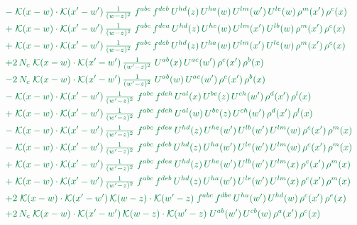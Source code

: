 \documentclass[10pt]{article}
\numberwithin{equation}{section}
\begin{document}
\begin{align}
&\quad{\color{JIM}-\;\mathcal{K}(x-w)\cdot\mathcal{K}(x'-w')\,\tfrac{1}{(w-z)^{2}}\;f^{abc}\,f^{deb}\,U^{hd}(z)\,U^{ha}(w)\,U^{lm}(w')\,U^{le}(w)\,\rho^{m}(x')\,\rho^{c}(x)}\notag\\
&\quad{\color{JIM}+\;\mathcal{K}(x-w)\cdot\mathcal{K}(x'-w')\,\tfrac{1}{(w-z)^{2}}\;f^{abc}\,f^{dea}\,U^{hd}(z)\,U^{he}(w)\,U^{lm}(x')\,U^{lb}(w)\,\rho^{m}(x')\,\rho^{c}(x)}\notag\\
&\quad{\color{JIM}+\;\mathcal{K}(x-w)\cdot\mathcal{K}(x'-w')\,\tfrac{1}{(w-z)^{2}}\;f^{abc}\,f^{deb}\,U^{hd}(z)\,U^{ha}(w)\,U^{lm}(x')\,U^{le}(w)\,\rho^{m}(x')\,\rho^{c}(x)}\notag\\
&\quad{\color{JIM}+2\,N_c\;\mathcal{K}(x-w)\cdot\mathcal{K}(x'-w')\,\tfrac{1}{(w'-z)^{2}}\;U^{ab}(x)\,U^{ac}(w')\,\rho^{c}(x')\,\rho^{b}(x)}\notag\\
&\quad{\color{JIM}-2\,N_c\;\mathcal{K}(x-w)\cdot\mathcal{K}(x'-w')\,\tfrac{1}{(w'-z)^{2}}\;U^{ab}(w)\,U^{ac}(w')\,\rho^{c}(x')\,\rho^{b}(x)}\notag\\
&\quad{\color{JIM}-\;\mathcal{K}(x-w)\cdot\mathcal{K}(x'-w')\,\tfrac{1}{(w'-z)^{2}}\;f^{abc}\,f^{deh}\,U^{al}(x)\,U^{be}(z)\,U^{ch}(w')\,\rho^{d}(x')\,\rho^{l}(x)}\notag\\
&\quad{\color{JIM}+\;\mathcal{K}(x-w)\cdot\mathcal{K}(x'-w')\,\tfrac{1}{(w'-z)^{2}}\;f^{abc}\,f^{deh}\,U^{al}(w)\,U^{be}(z)\,U^{ch}(w')\,\rho^{d}(x')\,\rho^{l}(x)}\notag\\
&\quad{\color{JIM}-\;\mathcal{K}(x-w)\cdot\mathcal{K}(x'-w')\,\tfrac{1}{(w'-z)^{2}}\;f^{abc}\,f^{dea}\,U^{hd}(z)\,U^{he}(w')\,U^{lb}(w')\,U^{lm}(w)\,\rho^{c}(x')\,\rho^{m}(x)}\notag\\
&\quad{\color{JIM}-\;\mathcal{K}(x-w)\cdot\mathcal{K}(x'-w')\,\tfrac{1}{(w'-z)^{2}}\;f^{abc}\,f^{deb}\,U^{hd}(z)\,U^{ha}(w')\,U^{le}(w')\,U^{lm}(w)\,\rho^{c}(x')\,\rho^{m}(x)}\notag\\
&\quad{\color{JIM}+\;\mathcal{K}(x-w)\cdot\mathcal{K}(x'-w')\,\tfrac{1}{(w'-z)^{2}}\;f^{abc}\,f^{dea}\,U^{hd}(z)\,U^{he}(w')\,U^{lb}(w')\,U^{lm}(x)\,\rho^{c}(x')\,\rho^{m}(x)}\notag\\
&\quad{\color{JIM}+\;\mathcal{K}(x-w)\cdot\mathcal{K}(x'-w')\,\tfrac{1}{(w'-z)^{2}}\;f^{abc}\,f^{deb}\,U^{hd}(z)\,U^{ha}(w')\,U^{le}(w')\,U^{lm}(x)\,\rho^{c}(x')\,\rho^{m}(x)}\notag\\
&\quad{\color{JIM}+2\;\mathcal{K}(x-w)\cdot\mathcal{K}(x'-w')\,\mathcal{K}(w-z)\cdot\mathcal{K}(w'-z)\;f^{abc}\,f^{dbe}\,U^{ha}(w')\,U^{hd}(w)\,\rho^{c}(x')\,\rho^{e}(x)}\notag\\
&\quad{\color{JIM}+2\,N_c\;\mathcal{K}(x-w)\cdot\mathcal{K}(x'-w')\,\mathcal{K}(w-z)\cdot\mathcal{K}(w'-z)\;U^{ab}(w')\,U^{cb}(w)\,\rho^{a}(x')\,\rho^{c}(x)}\notag\\

\end{align}
\end{document}
